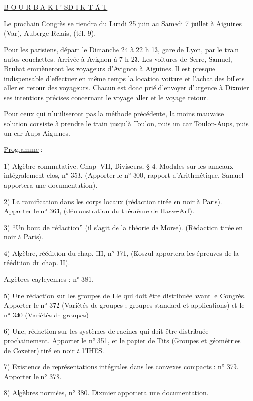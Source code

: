 \begin{center}\uline{B O U R B A K I ' S\quad D I K T Ä T}\end{center}

Le prochain Congrès se tiendra du Lundi 25 juin au Samedi 7 juillet à Aiguines (Var), Auberge Relais, (tél. 9).

Pour les parisiens, départ le Dimanche 24 à 22 h 13, gare de Lyon, par le train autos-couchettes. Arrivée à Avignon à 7 h 23. Les voitures de Serre, Samuel, Bruhat emmèneront les voyageurs d'Avignon à Aiguines. Il est presque indispensable d'effectuer en même temps la location voiture et l'achat des billets aller et retour des voyageurs. Chacun est donc prié d'envoyer \uline{d'urgence} à Dixmier ses intentions précises concernant le voyage aller et le voyage retour.

Pour ceux qui n'utiliseront pas la méthode précédente, la moins mauvaise solution consiste à prendre le train jusqu'à Toulon, puis un car Toulon-Aups, puis un car Aups-Aiguines.

\uline{Programme} :

1) Algèbre commutative. Chap. VII, Diviseurs, § 4, Modules sur les anneaux intégralement clos, n° 353. (Apporter le n° 300, rapport d'Arithmétique. Samuel apportera une documentation).

2) La ramification dans les corps locaux (rédaction tirée en noir à Paris). Apporter le n° 363, (démonstration du théorème de Hasse-Arf).

3) ``Un bout de rédaction'' (il s'agit de la théorie de Morse). (Rédaction tirée en noir à Paris).

4) Algèbre, réédition du chap. III, n° 371, (Koszul apportera les épreuves de la réédition du chap. II).

Algèbres cayleyennes : n° 381.

5) Une rédaction sur les groupes de Lie qui doit être distribuée avant le Congrès. Apporter le n° 372 (Variétés de groupes ; groupes standard et applications) et le n° 340 (Variétés de groupes).

6) Une, rédaction sur les systèmes de racines qui doit être distribuée prochainement. Apporter le n° 351, et le papier de Tits (Groupes et géométries de Coxeter) tiré en noir à l'IHES.

7) Existence de représentations intégrales dans les convexes compacts : n° 379. Apporter le n° 378.

8) Algèbres normées, n° 380. Dixmier apportera une documentation.

